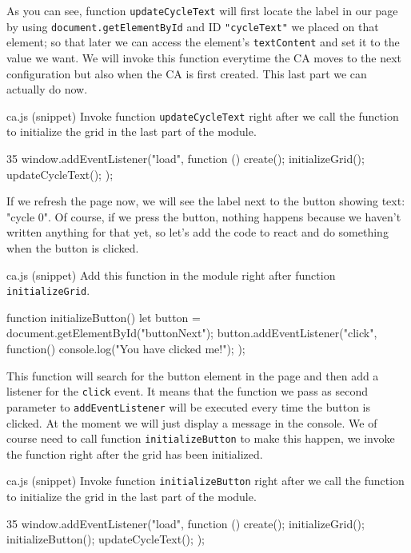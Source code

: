 As you can see, function \texttt{updateCycleText} will first locate the label in our page by using
\texttt{document.getElementById} and ID \texttt{"cycleText"} we placed on that element; so that later
we can access the element's \texttt{textContent} and set it to the value we want. We will invoke
this function everytime the CA moves to the next configuration but also when the CA is first created.
This last part we can actually do now.

\begin{programcode}{ca.js (snippet)}
Invoke function \texttt{updateCycleText} right after we call the function to initialize the grid in
the last part of the module.
\begin{codeh1}{3}{5}
window.addEventListener("load", function () {
  create();
  initializeGrid();
  updateCycleText();
});
\end{codeh1}
\end{programcode}

If we refresh the page now, we will see the label next to the button showing text: "cycle 0". Of course,
if we press the button, nothing happens because we haven't written anything for that yet, so let's add
the code to react and do something when the button is clicked.

\begin{programcode}{ca.js (snippet)}
Add this function in the module right after function \texttt{initializeGrid}.
\begin{code}
function initializeButton() {
  let button = document.getElementById("buttonNext");
  button.addEventListener("click", function(){
    console.log("You have clicked me!");
  });
}
\end{code}
\end{programcode}

This function will search for the button element in the page and then add a listener for the \texttt{click}
event. It means that the function we pass as second parameter to \texttt{addEventListener} will be executed
every time the button is clicked. At the  moment we will just display a message in the console. We
of course need to call function \texttt{initializeButton} to make this happen, we invoke the function
right after the grid has been initialized.

\begin{programcode}{ca.js (snippet)}
Invoke function \texttt{initializeButton} right after we call the function to initialize the grid in
the last part of the module.
\begin{codeh1}{3}{5}
window.addEventListener("load", function () {
  create();
  initializeGrid();
  initializeButton();
  updateCycleText();
});
\end{codeh1}
\end{programcode}

